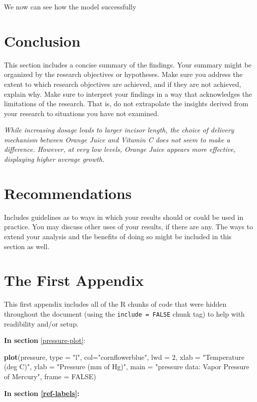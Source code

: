 \documentclass[12pt,oneside]{chicagocapstone}
\newenvironment{Shaded}{\begin{snugshade}}{\end{snugshade}}
\newcommand{\DataTypeTok}[1]{\textcolor[rgb]{0.13,0.29,0.53}{#1}}
\newcommand{\DecValTok}[1]{\textcolor[rgb]{0.00,0.00,0.81}{#1}}
\newcommand{\KeywordTok}[1]{\textcolor[rgb]{0.13,0.29,0.53}{\textbf{#1}}}
\newcommand{\NormalTok}[1]{#1}
\newcommand{\OtherTok}[1]{\textcolor[rgb]{0.56,0.35,0.01}{#1}}
\newcommand{\StringTok}[1]{\textcolor[rgb]{0.31,0.60,0.02}{#1}}
\begin{document}
We now can see how the model successfully

\hypertarget{conclusion}{%
\chapter*{Conclusion}\label{conclusion}}

This section includes a concise summary of the findings. Your summary might be organized by the research objectives or hypotheses. Make sure you address the extent to which research objectives are achieved, and if they are not achieved, explain why. Make sure to interpret your findings in a way that acknowledges the limitations of the research. That is, do not extrapolate the insights derived from your research to situations you have not examined.

\emph{While increasing dosage leads to larger incisor length, the choice of delivery mechanism between Orange Juice and Vitamin C does not seem to make a difference. However, at very low levels, Orange Juice appears more effective, displaying higher average growth.}

\hypertarget{recommendations}{%
\chapter*{Recommendations}\label{recommendations}}

Includes guidelines as to ways in which your results should or could be used in practice. You may discuss other uses of your results, if there are any. The ways to extend your analysis and the benefits of doing so might be included in this section as well.

\appendix

\hypertarget{the-first-appendix}{%
\chapter{The First Appendix}\label{the-first-appendix}}

This first appendix includes all of the R chunks of code that were hidden throughout the document (using the \texttt{include\ =\ FALSE} chunk tag) to help with readibility and/or setup.

\textbf{In section} \ref{pressure-plot}:
\begin{Shaded}
\begin{Highlighting}[]
\KeywordTok{plot}\NormalTok{(pressure, }\DataTypeTok{type =} \StringTok{"l"}\NormalTok{, }\DataTypeTok{col=}\StringTok{"cornflowerblue"}\NormalTok{, }\DataTypeTok{lwd =} \DecValTok{2}\NormalTok{,}
               \DataTypeTok{xlab =} \StringTok{"Temperature (deg C)"}\NormalTok{,}
               \DataTypeTok{ylab =} \StringTok{"Pressure (mm of Hg)"}\NormalTok{,}
               \DataTypeTok{main =} \StringTok{"pressure data: Vapor Pressure of Mercury"}\NormalTok{,}
               \DataTypeTok{frame =} \OtherTok{FALSE}\NormalTok{)}
\end{Highlighting}
\end{Shaded}
\textbf{In section \ref{ref-labels}:}
\end{document}
